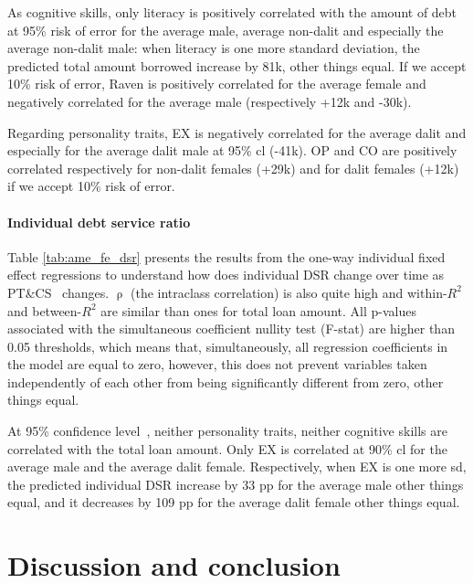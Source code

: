 \documentclass[a4paper, 11pt, onecolumn]{article}
\newcommand{\sd}{standard deviation}
\newcommand{\ote}{other things equal}
\newcommand{\cl}{confidence level}
\newcommand{\PTCS}{PT\&CS}
\begin{document}
As cognitive skills, only literacy is positively correlated with the amount of debt at 95\% risk of error for the average male, average non-dalit and especially the average non-dalit male: when literacy is one more \sd, the predicted total amount borrowed increase by \rupee81k, \ote.
If we accept 10\% risk of error, Raven is positively correlated for the average female and negatively correlated for the average male (respectively +\rupee12k and -\rupee30k).

Regarding personality traits, EX is negatively correlated for the average dalit and especially for the average dalit male at 95\% cl (-\rupee41k).
OP and CO are positively correlated respectively for non-dalit females (+\rupee29k) and for dalit females (+\rupee12k) if we accept 10\% risk of error.



\paragraph{Individual debt service ratio}
Table \ref{tab:ame_fe_dsr} presents the results from the one-way individual fixed effect regressions to understand how does individual DSR change over time as \PTCS~ changes.
$\uprho$ (the intraclass correlation) is also quite high and within-$R^2$ and between-$R^2$ are similar than ones for total loan amount.
All p-values associated with the simultaneous coefficient nullity test (F-stat) are higher than 0.05 thresholds, which means that, simultaneously, all regression coefficients in the model are equal to zero, however, this does not prevent variables taken independently of each other from being significantly different from zero, \ote.

At 95\% \cl~, neither personality traits, neither cognitive skills are correlated with the total loan amount.
Only EX is correlated at 90\% cl for the average male and the average dalit female.
Respectively, when EX is one more sd, the predicted individual DSR increase by 33 pp for the average male \ote, and it decreases by 109 pp for the average dalit female \ote.




\section{Discussion and conclusion}
\end{document}
